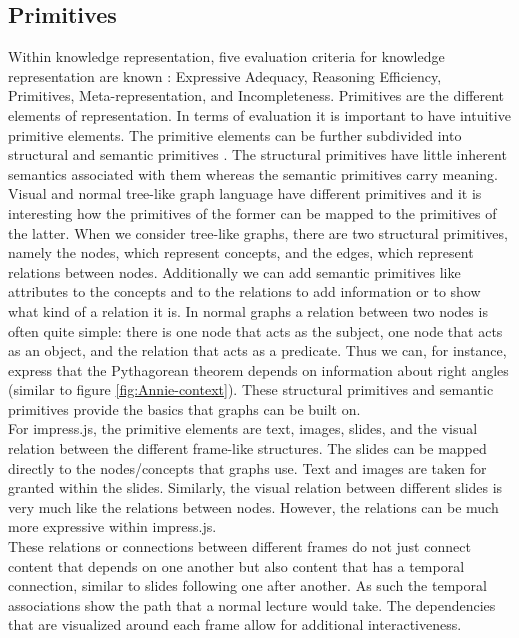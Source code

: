\documentclass[twoside, 12pt]{article}
\begin{document}
\subsection{Primitives}
\label{sec:primitives}

Within knowledge representation, five evaluation criteria for knowledge representation are known \cite{Kohlhase:Complog:base}: Expressive Adequacy, Reasoning Efficiency, Primitives, Meta-representation, and Incompleteness. Primitives are the different elements of representation. In terms of evaluation it is important to have intuitive primitive elements. The primitive elements can be further subdivided into structural and semantic primitives \cite{DBLP:dblp_conf/acl/Salveter80}. The structural primitives have little inherent semantics associated with them whereas the semantic primitives carry meaning.\\

Visual and normal tree-like graph language have different primitives and it is interesting how the primitives of the former can be mapped to the primitives of the latter. When we consider tree-like graphs, there are two structural primitives, namely the nodes, which represent concepts, and the edges, which represent relations between nodes. Additionally we can add semantic primitives like attributes to the concepts and to the relations to add information or to show what kind of a relation it is. In normal graphs a relation between two nodes is often quite simple: there is one node that acts as the subject, one node that acts as an object, and the relation that acts as a predicate. Thus we can, for instance, express that the Pythagorean theorem depends on information about right angles (similar to figure \ref{fig:Annie-context}). These structural primitives and semantic primitives provide the basics that graphs can be built on.\\

For impress.js, the primitive elements are text, images, slides, and the visual relation between the different frame-like structures. The slides can be mapped directly to the nodes/concepts that graphs use. Text and images are taken for granted within the slides. Similarly, the visual relation between different slides is very much like the relations between nodes. However, the relations can be much more expressive within impress.js.\\

These relations or connections between different frames do not just connect content that depends on one another but also content that has a temporal connection, similar to slides following one after another. As such the temporal associations show the path that a normal lecture would take. The dependencies that are visualized around each frame allow for additional interactiveness.\\
\end{document}
